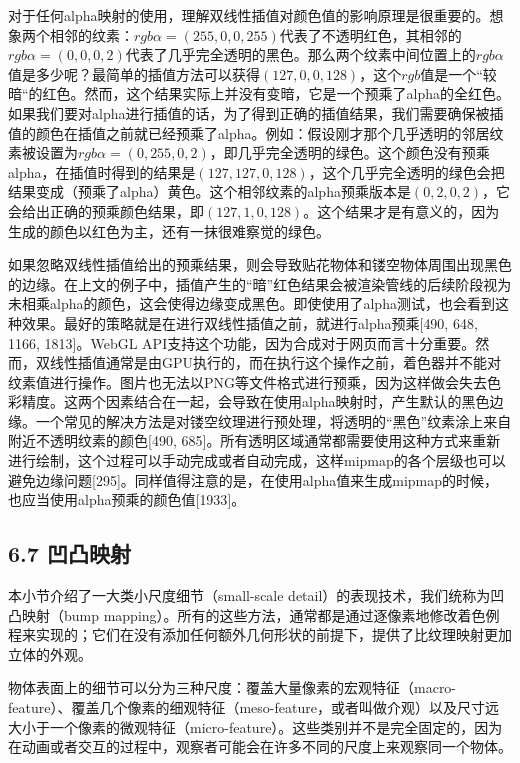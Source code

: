 \documentclass[
  paper=a4,
  ,captions=tableheading
]{scrartcl}
\begin{document}
对于任何alpha映射的使用，理解双线性插值对颜色值的影响原理是很重要的。想象两个相邻的纹素：\(rgb\alpha =(255,0,0,255)\)代表了不透明红色，其相邻的\(rgb\alpha =(0,0,0,2)\)代表了几乎完全透明的黑色。那么两个纹素中间位置上的\(rgb\alpha\)值是多少呢？最简单的插值方法可以获得\((127,0,0,128)\)，这个\(rgb\)值是一个``较暗``的红色。然而，这个结果实际上并没有变暗，它是一个预乘了alpha的全红色。如果我们要对alpha进行插值的话，为了得到正确的插值结果，我们需要确保被插值的颜色在插值之前就已经预乘了alpha。例如：假设刚才那个几乎透明的邻居纹素被设置为\(rgb\alpha =(0,255,0,2)\)，即几乎完全透明的绿色。这个颜色没有预乘alpha，在插值时得到的结果是\((127,127,0,128)\)，这个几乎完全透明的绿色会把结果变成（预乘了alpha）黄色。这个相邻纹素的alpha预乘版本是\((0,2,0,2)\)，它会给出正确的预乘颜色结果，即\((127,1,0,128)\)。这个结果才是有意义的，因为生成的颜色以红色为主，还有一抹很难察觉的绿色。

如果忽略双线性插值给出的预乘结果，则会导致贴花物体和镂空物体周围出现黑色的边缘。在上文的例子中，插值产生的``暗''红色结果会被渲染管线的后续阶段视为未相乘alpha的颜色，这会使得边缘变成黑色。即使使用了alpha测试，也会看到这种效果。最好的策略就是在进行双线性插值之前，就进行alpha预乘{[}490,
648, 1166, 1813{]}。WebGL
API支持这个功能，因为合成对于网页而言十分重要。然而，双线性插值通常是由GPU执行的，而在执行这个操作之前，着色器并不能对纹素值进行操作。图片也无法以PNG等文件格式进行预乘，因为这样做会失去色彩精度。这两个因素结合在一起，会导致在使用alpha映射时，产生默认的黑色边缘。一个常见的解决方法是对镂空纹理进行预处理，将透明的``黑色''纹素涂上来自附近不透明纹素的颜色{[}490,
685{]}。所有透明区域通常都需要使用这种方式来重新进行绘制，这个过程可以手动完成或者自动完成，这样mipmap的各个层级也可以避免边缘问题{[}295{]}。同样值得注意的是，在使用alpha值来生成mipmap的时候，也应当使用alpha预乘的颜色值{[}1933{]}。

\subsection{6.7 凹凸映射}\label{ux51f9ux51f8ux6620ux5c04}

本小节介绍了一大类小尺度细节（small-scale
detail）的表现技术，我们统称为凹凸映射（bump
mapping）。所有的这些方法，通常都是通过逐像素地修改着色例程来实现的；它们在没有添加任何额外几何形状的前提下，提供了比纹理映射更加立体的外观。

物体表面上的细节可以分为三种尺度：覆盖大量像素的宏观特征（macro-feature）、覆盖几个像素的细观特征（meso-feature，或者叫做介观）以及尺寸远大小于一个像素的微观特征（micro-feature）。这些类别并不是完全固定的，因为在动画或者交互的过程中，观察者可能会在许多不同的尺度上来观察同一个物体。
\end{document}
